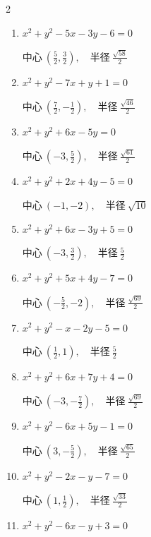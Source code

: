 \begin{multicols}{2}
\begin{enumerate}
        $\displaystyle 中心\: \left(1,-\frac{7}{2}\right), \quad 半径 \ \frac{5}{2}$

  \item $x^{2}+y^{2}-5x-3y-6=0$

        $\displaystyle 中心\: \left(\frac{5}{2},\frac{3}{2}\right), \quad 半径 \ \frac{\sqrt{58}}{2}$

  \item $x^{2}+y^{2}-7x+y+1=0$

        $\displaystyle 中心\: \left(\frac{7}{2},-\frac{1}{2}\right), \quad 半径 \ \frac{\sqrt{46}}{2}$

  \item $x^{2}+y^{2}+6x-5y=0$

        $\displaystyle 中心\: \left(-3,\frac{5}{2}\right), \quad 半径 \ \frac{\sqrt{61}}{2}$

  \item $x^{2}+y^{2}+2x+4y-5=0$

        $\displaystyle 中心\: \left(-1,-2\right), \quad 半径 \ \sqrt{10}$

  \item $x^{2}+y^{2}+6x-3y+5=0$

        $\displaystyle 中心\: \left(-3,\frac{3}{2}\right), \quad 半径 \ \frac{5}{2}$

  \item $x^{2}+y^{2}+5x+4y-7=0$

        $\displaystyle 中心\: \left(-\frac{5}{2},-2\right), \quad 半径 \ \frac{\sqrt{69}}{2}$

  \item $x^{2}+y^{2}-x-2y-5=0$

        $\displaystyle 中心\: \left(\frac{1}{2},1\right), \quad 半径 \ \frac{5}{2}$

  \item $x^{2}+y^{2}+6x+7y+4=0$

        $\displaystyle 中心\: \left(-3,-\frac{7}{2}\right), \quad 半径 \ \frac{\sqrt{69}}{2}$

  \item $x^{2}+y^{2}-6x+5y-1=0$

        $\displaystyle 中心\: \left(3,-\frac{5}{2}\right), \quad 半径 \ \frac{\sqrt{65}}{2}$

  \item $x^{2}+y^{2}-2x-y-7=0$

        $\displaystyle 中心\: \left(1,\frac{1}{2}\right), \quad 半径 \ \frac{\sqrt{33}}{2}$

  \item $x^{2}+y^{2}-6x-y+3=0$


\end{enumerate}
\end{multicols}
